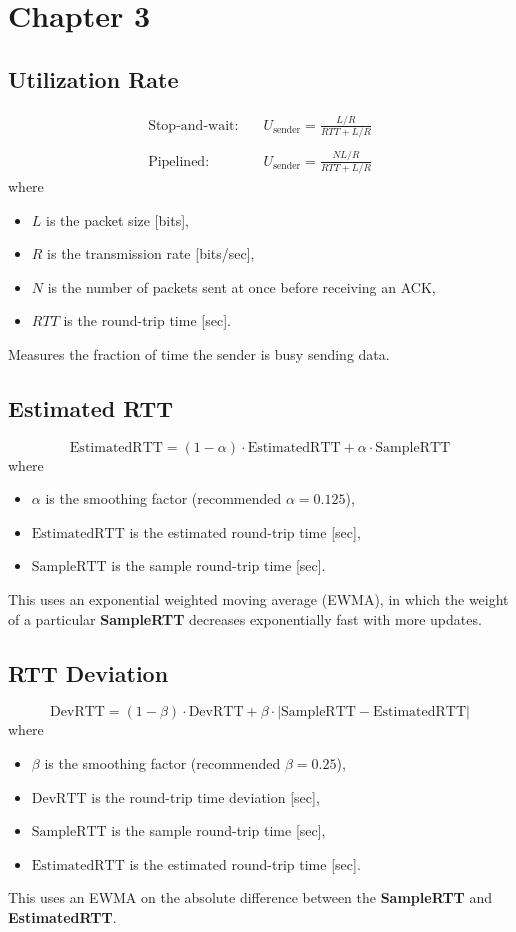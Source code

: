 \section{Chapter 3}

\subsection{Utilization Rate}
\begin{align*}
    \text{Stop-and-wait:}\quad & U_\text{sender} = \frac{L/R}{RTT + L/R}  \\
    \\
    \text{Pipelined:}\quad     & U_\text{sender} = \frac{NL/R}{RTT + L/R}
\end{align*}
where
\begin{itemize}
    \item $L$ is the packet size [bits],
    \item $R$ is the transmission rate [bits/sec],
    \item $N$ is the number of packets sent at once before receiving an ACK,
    \item $RTT$ is the round-trip time [sec].
\end{itemize}
Measures the fraction of time the sender is busy sending data.
\subsection{Estimated RTT}
\begin{equation*}
    \text{EstimatedRTT} = (1 - \alpha) \cdot \text{EstimatedRTT} + \alpha \cdot \text{SampleRTT}
\end{equation*}
where
\begin{itemize}
    \item $\alpha$ is the smoothing factor (recommended $\alpha = 0.125$),
    \item $\text{EstimatedRTT}$ is the estimated round-trip time [sec],
    \item $\text{SampleRTT}$ is the sample round-trip time [sec].
\end{itemize}
This uses an exponential weighted moving average (EWMA), in which the weight of a particular \textbf{SampleRTT} decreases exponentially fast with more updates.
\subsection{RTT Deviation}
\begin{equation*}
    \text{DevRTT} = (1 - \beta) \cdot \text{DevRTT} + \beta \cdot |\text{SampleRTT} - \text{EstimatedRTT}|
\end{equation*}
where
\begin{itemize}
    \item $\beta$ is the smoothing factor (recommended $\beta = 0.25$),
    \item $\text{DevRTT}$ is the round-trip time deviation [sec],
    \item $\text{SampleRTT}$ is the sample round-trip time [sec],
    \item $\text{EstimatedRTT}$ is the estimated round-trip time [sec].
\end{itemize}
This uses an EWMA on the absolute difference between the \textbf{SampleRTT} and \textbf{EstimatedRTT}.
